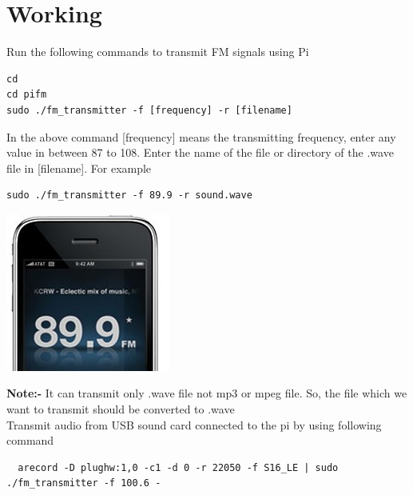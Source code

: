 \documentclass[journal,12pt,twocolumn]{IEEEtran}
\begin{document}
\section{Working}
Run the following commands to transmit FM signals using Pi  
\begin{lstlisting}
cd 
cd pifm
sudo ./fm_transmitter -f [frequency] -r [filename]
\end{lstlisting}
In the above command [frequency] means the transmitting frequency, enter any value in between 87 to 108. Enter the name of the file or directory of the .wave file in [filename]. For example
\begin{lstlisting}
sudo ./fm_transmitter -f 89.9 -r sound.wave
\end{lstlisting}
\begin{center}
\includegraphics[scale=0.5]{Figures/iphone_radio}
\end{center}


\textbf{Note:-} It can transmit only .wave file not mp3 or mpeg file. So, the file which we want to transmit should be converted to .wave\\

Transmit audio from USB sound card connected to the pi by using following command

\begin{lstlisting}
  arecord -D plughw:1,0 -c1 -d 0 -r 22050 -f S16_LE | sudo ./fm_transmitter -f 100.6 -
\end{lstlisting}


\end{document}
